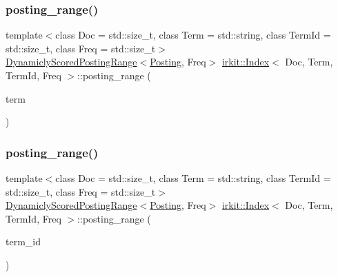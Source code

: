 \mbox{\label{classirkit_1_1Index_adf8d2508d3f7a5085468b3dc8e25036b}} 
\subsubsection{\texorpdfstring{posting\+\_\+range()}{posting\_range()}\hspace{0.1cm}{\footnotesize\ttfamily [1/2]}}
{\footnotesize\ttfamily template$<$class Doc  = std\+::size\+\_\+t, class Term  = std\+::string, class Term\+Id  = std\+::size\+\_\+t, class Freq  = std\+::size\+\_\+t$>$ \\
\hyperlink{classirkit_1_1DynamiclyScoredPostingRange}{Dynamicly\+Scored\+Posting\+Range}$<$\hyperlink{structirkit_1_1__Posting}{Posting}, Freq$>$ \hyperlink{classirkit_1_1Index}{irkit\+::\+Index}$<$ Doc, Term, Term\+Id, Freq $>$\+::posting\+\_\+range (\begin{DoxyParamCaption}\item[{const std\+::string \&}]{term }\end{DoxyParamCaption})\hspace{0.3cm}{\ttfamily [inline]}}

\mbox{\label{classirkit_1_1Index_a1b906859b75305b79835a2f0955168b9}} 
\subsubsection{\texorpdfstring{posting\+\_\+range()}{posting\_range()}\hspace{0.1cm}{\footnotesize\ttfamily [2/2]}}
{\footnotesize\ttfamily template$<$class Doc  = std\+::size\+\_\+t, class Term  = std\+::string, class Term\+Id  = std\+::size\+\_\+t, class Freq  = std\+::size\+\_\+t$>$ \\
\hyperlink{classirkit_1_1DynamiclyScoredPostingRange}{Dynamicly\+Scored\+Posting\+Range}$<$\hyperlink{structirkit_1_1__Posting}{Posting}, Freq$>$ \hyperlink{classirkit_1_1Index}{irkit\+::\+Index}$<$ Doc, Term, Term\+Id, Freq $>$\+::posting\+\_\+range (\begin{DoxyParamCaption}\item[{Term\+Id}]{term\+\_\+id }\end{DoxyParamCaption})\hspace{0.3cm}{\ttfamily [inline]}}

